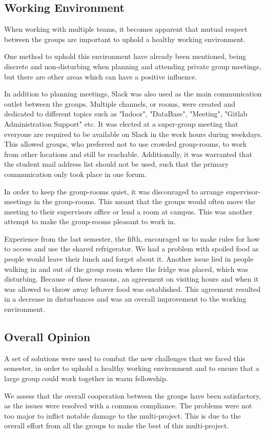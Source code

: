 \subsection{Working Environment}
When working with multiple teams, it becomes apparent that mutual respect between the groups are important to uphold a healthy working environment.

One method to uphold this environment have already been mentioned, being discrete and non-disturbing when planning and attending private group meetings, but there are other areas which can have a positive influence. 

In addition to planning meetings, Slack was also used as the main communication outlet between the groups. Multiple channels, or rooms, were created and dedicated to different topics such as "Indoor", "DataBase", "Meeting", "Gitlab Administration Support" etc. It was elected at a super-group meeting that everyone are required to be available on Slack in the work hours during weekdays. This allowed groups, who preferred not to use crowded group-rooms, to work from other locations and still be reachable. Additionally, it was warranted that the student mail address list should not be used, such that the primary communication only took place in one forum.  

In order to keep the group-rooms quiet, it was discouraged to arrange supervisor-meetings in the group-rooms. This meant that the groups would often move the meeting to their supervisors office or lend a room at campus. This was another attempt to make the group-rooms pleasant to work in.

Experience from the last semester, the fifth, encouraged us to make rules for how to access and use the shared refrigerator. We had a problem with spoiled food as people would leave their lunch and forget about it. Another issue lied in people walking in and out of the group room where the fridge was placed, which was disturbing. Because of these reasons, an agreement on visiting hours and when it was allowed to throw away leftover food was established. This agreement resulted in a decrease in disturbances and was an overall improvement to the working environment. 

\subsection{Overall Opinion}
A set of solutions were used to combat the new challenges that we faced this semester, in order to uphold a healthy working environment and to ensure that a large group could work together in warm fellowship.

We assess that the overall cooperation between the groups have been satisfactory, as the issues were resolved with a common compliance. The problems were not too major to inflict notable damage to the multi-project. This is due to the overall effort from all the groups to make the best of this multi-project.
